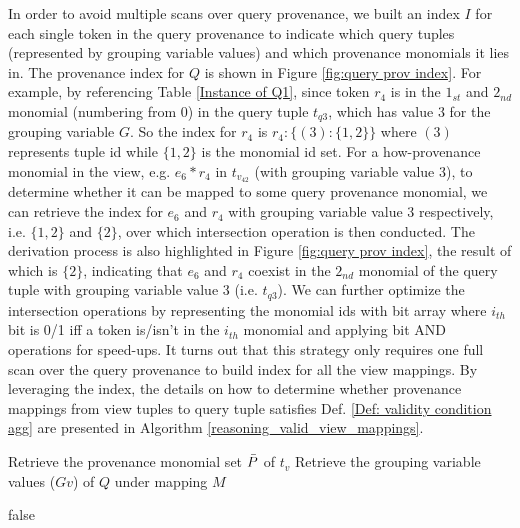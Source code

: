 \begin{example}
In order to avoid multiple scans over query provenance, we built an index $I$ for each single token in the query provenance to indicate which query tuples (represented by grouping variable values) and which provenance monomials it lies in. The provenance index for $Q$ is shown in Figure \ref{fig:query prov index}. For example, by referencing Table \ref{Instance of Q1}, since token $r_4$ is in the $1_{st}$ and $2_{nd}$ monomial (numbering from 0) in the query tuple $t_{q3}$, which has value $3$ for the grouping variable $G$. So the index for $r_4$ is $r_4:\{(3):\{1,2\}\}$ where $(3)$ represents tuple id while $\{1,2\}$ is the monomial id set. For a how-provenance monomial in the view, e.g. $e_6*r_4$ in $t_{v_42}$ (with grouping variable value 3), to determine whether it can be mapped to some query provenance monomial, we can retrieve the index for $e_6$ and $r_4$ with grouping variable value $3$ respectively, i.e. $\{1,2\}$ and $\{2\}$, over which intersection operation is then conducted. The derivation process is also highlighted in Figure \ref{fig:query prov index}, the result of which is $\{2\}$, indicating that $e_6$ and $r_4$ coexist in the $2_{nd}$ monomial of the query tuple with grouping variable value 3 (i.e. $t_{q3}$). We can further optimize the intersection operations by representing the monomial ids with bit array where $i_{th}$ bit is 0/1 iff a token is/isn't in the $i_{th}$ monomial and applying bit AND operations for speed-ups. It turns out that this strategy only requires one full scan over the query provenance to build index for all the view mappings. By leveraging the index, the details on how to determine whether provenance mappings from view tuples to query tuple satisfies Def. \ref{Def: validity condition agg} are presented in Algorithm \ref{reasoning_valid_view_mappings}.

\begin{algorithm}[h!] 
\footnotesize

 
{
    Retrieve the provenance monomial set $\Bar{P}$ of $t_v$
    Retrieve the grouping variable values ($Gv$) of $Q$ under mapping $M$

    {
        {
            {
                \Return false
            }
            
}}}
\end{algorithm}
\end{example}
